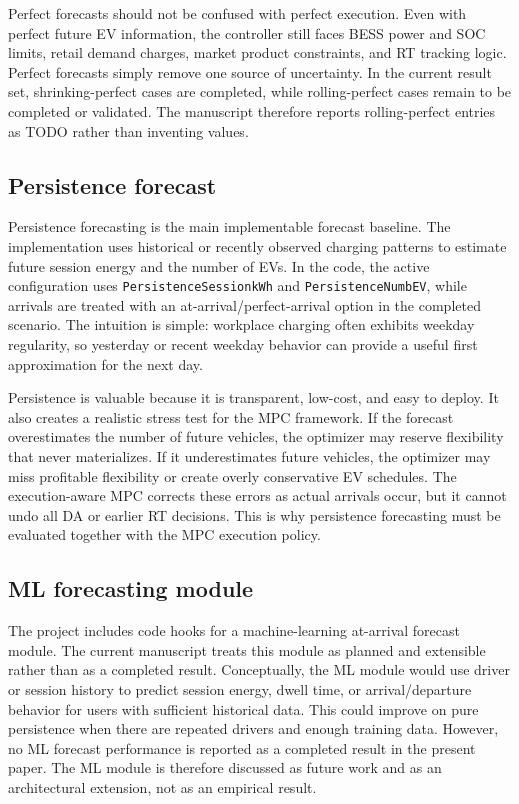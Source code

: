 \documentclass[final,5p,times]{elsarticle}
\begin{document}
Perfect forecasts should not be confused with perfect execution. Even with perfect future EV information, the controller still faces BESS power and SOC limits, retail demand charges, market product constraints, and RT tracking logic. Perfect forecasts simply remove one source of uncertainty. In the current result set, shrinking-perfect cases are completed, while rolling-perfect cases remain to be completed or validated. The manuscript therefore reports rolling-perfect entries as TODO rather than inventing values.

\subsection{Persistence forecast}
Persistence forecasting is the main implementable forecast baseline. The implementation uses historical or recently observed charging patterns to estimate future session energy and the number of EVs. In the code, the active configuration uses \texttt{PersistenceSessionkWh} and \texttt{PersistenceNumbEV}, while arrivals are treated with an at-arrival/perfect-arrival option in the completed scenario. The intuition is simple: workplace charging often exhibits weekday regularity, so yesterday or recent weekday behavior can provide a useful first approximation for the next day.

Persistence is valuable because it is transparent, low-cost, and easy to deploy. It also creates a realistic stress test for the MPC framework. If the forecast overestimates the number of future vehicles, the optimizer may reserve flexibility that never materializes. If it underestimates future vehicles, the optimizer may miss profitable flexibility or create overly conservative EV schedules. The execution-aware MPC corrects these errors as actual arrivals occur, but it cannot undo all DA or earlier RT decisions. This is why persistence forecasting must be evaluated together with the MPC execution policy.

\subsection{ML forecasting module}
The project includes code hooks for a machine-learning at-arrival forecast module. The current manuscript treats this module as planned and extensible rather than as a completed result. Conceptually, the ML module would use driver or session history to predict session energy, dwell time, or arrival/departure behavior for users with sufficient historical data. This could improve on pure persistence when there are repeated drivers and enough training data. However, no ML forecast performance is reported as a completed result in the present paper. The ML module is therefore discussed as future work and as an architectural extension, not as an empirical result.
\end{document}
